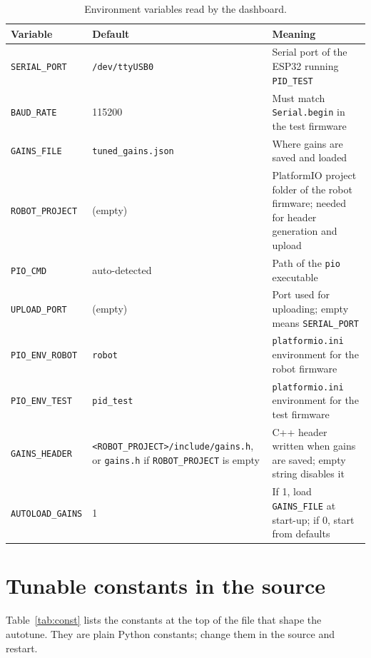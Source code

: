 \documentclass[11pt,a4paper]{report}
\newcommand{\code}[1]{\texttt{#1}}
\begin{document}
\begin{table}[H]
\centering
\caption{Environment variables read by the dashboard.}\label{tab:env}
\small
\begin{tabular}{@{}llp{6.2cm}@{}}
\toprule
Variable & Default & Meaning\\
\midrule
\code{SERIAL\_PORT} & \code{/dev/ttyUSB0} & Serial port of the ESP32 running \code{PID\_TEST}\\
\code{BAUD\_RATE} & 115200 & Must match \code{Serial.begin} in the test firmware\\
\code{GAINS\_FILE} & \code{tuned\_gains.json} & Where gains are saved and loaded\\
\code{ROBOT\_PROJECT} & (empty) & PlatformIO project folder of the robot firmware; needed for header generation and upload\\
\code{PIO\_CMD} & auto-detected & Path of the \code{pio} executable\\
\code{UPLOAD\_PORT} & (empty) & Port used for uploading; empty means \code{SERIAL\_PORT}\\
\code{PIO\_ENV\_ROBOT} & \code{robot} & \code{platformio.ini} environment for the robot firmware\\
\code{PIO\_ENV\_TEST} & \code{pid\_test} & \code{platformio.ini} environment for the test firmware\\
\code{GAINS\_HEADER} & \code{<ROBOT\_PROJECT>/include/gains.h}, or \code{gains.h} if \code{ROBOT\_PROJECT} is empty & C++ header written when gains are saved; empty string disables it\\
\code{AUTOLOAD\_GAINS} & 1 & If 1, load \code{GAINS\_FILE} at start-up; if 0, start from defaults\\
\bottomrule
\end{tabular}
\end{table}

\section{Tunable constants in the source}
Table~\ref{tab:const} lists the constants at the top of the file that shape the autotune. They are plain Python constants; change them in the source and restart.
\end{document}
